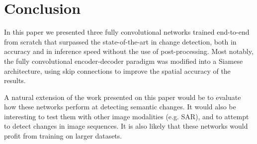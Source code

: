\documentclass{article}
\begin{document}
\section{Conclusion}
\label{sec:conclusion}

In this paper we presented three fully convolutional networks trained end-to-end from scratch that surpassed the state-of-the-art in change detection, both in accuracy and in inference speed without the use of post-processing. Most notably, the fully convolutional encoder-decoder paradigm was modified into a Siamese architecture, using skip connections to improve the spatial accuracy of the results.

A natural extension of the work presented on this paper would be to evaluate how these networks perform at detecting semantic changes. It would also be interesting to test them with other image modalities (e.g. SAR), and to attempt to detect changes in image sequences. It is also likely that these networks would profit from training on larger datasets.












\newpage





\end{document}
